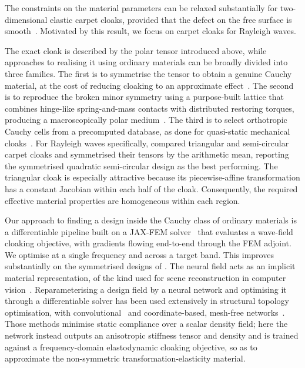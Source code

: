\documentclass[preprint,12pt]{elsarticle}
\begin{document}
The constraints on the material parameters can be  relaxed substantially for two-dimensional elastic carpet cloaks, provided that the defect on the free surface is smooth~\citep{quadrelli2021elastic}. 
Motivated by this result, we focus on carpet cloaks for Rayleigh waves. 

The exact cloak is described by the polar tensor introduced above, while approaches to realising it using ordinary materials can be broadly divided into three families. The first is to symmetrise the tensor to obtain a genuine Cauchy material, at the cost of reducing cloaking to an approximate effect~\citep{norris2008,norris2011}. The second is to reproduce the broken minor symmetry using a purpose-built lattice that combines hinge-like spring-and-mass contacts with distributed restoring torques, producing a macroscopically polar medium~\citep{nassar2018}. The third is to select orthotropic Cauchy cells from a precomputed database, as done for quasi-static mechanical cloaks~\citep{wang2022}. For Rayleigh waves specifically,
\citet{chatzopoulos2023} compared triangular and semi-circular carpet
cloaks and symmetrised their tensors by the arithmetic mean, reporting the
symmetrised quadratic semi-circular design as the best performing.
The triangular cloak is especially attractive because its piecewise-affine transformation has a constant Jacobian within each half of the cloak. Consequently, the required effective material properties are homogeneous within each region.

Our approach to finding a design inside the Cauchy class of ordinary
materials is a differentiable pipeline built on a JAX-FEM solver~\citep{xu2020jaxfem}
that evaluates a wave-field cloaking objective, with gradients flowing
end-to-end through the FEM adjoint. We optimise
at a single frequency and across a target band. This
improves substantially on the symmetrised designs of
\citet{chatzopoulos2023}. The neural field acts as an implicit material
representation, of the kind used for scene reconstruction in computer
vision~\citep{mildenhall2020nerf,sitzmann2020siren,tancik2020fourier}.
Reparameterising a design field by a neural network and optimising it
through a differentiable solver has been used extensively in structural
topology optimisation, with convolutional~\citep{hoyer2019} and
coordinate-based, mesh-free networks~\citep{chandrasekhar2021,zehnder2021}.
Those methods minimise static compliance over a scalar density field; here
the network instead outputs an anisotropic stiffness tensor and density and
is trained against a frequency-domain elastodynamic cloaking objective, so
as to approximate the non-symmetric transformation-elasticity material.
\end{document}
